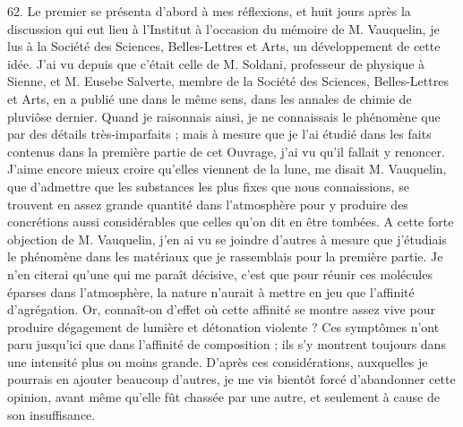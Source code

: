 \documentclass[a4paper, 11pt, oneside, polutonikogreek, french]{article}
\begin{document}
62. Le premier se présenta d'abord à mes réflexions, et huit jours après la discussion qui eut lieu à l'Institut à l'occasion du mémoire de M. Vauquelin, je lus à la Société des Sciences, Belles-Lettres et Arts, un développement de cette idée. J'ai vu depuis que c'était celle de M. Soldani, professeur de physique à Sienne, et M. Eusebe Salverte, membre de la Société des Sciences, Belles-Lettres et Arts, en a publié une dans le même sens, dans les annales de chimie de pluviôse dernier. Quand je raisonnais ainsi, je ne connaissais le phénomène que par des détails très-imparfaits ; mais à mesure que je l'ai étudié dans les faits contenus dans la première partie de cet Ouvrage, j'ai vu qu'il fallait y renoncer. \og J'aime encore mieux croire qu'elles viennent de la lune, me disait M. Vauquelin, que d'admettre que les substances les plus fixes que nous connaissions, se trouvent en assez grande quantité dans l'atmosphère pour y produire des concrétions aussi considérables que celles qu'on dit en être tombées. \fg A cette forte objection de M. Vauquelin, j'en ai vu se joindre d'autres à mesure que j'étudiais le phénomène dans les matériaux que je rassemblais pour la première partie. Je n'en citerai qu'une qui me paraît décisive, c'est que pour réunir ces molécules éparses dans l'atmosphère, la nature n'aurait à mettre en jeu que l'affinité d'agrégation. Or, connaît-on d'effet où cette affinité se montre assez vive pour produire dégagement de lumière et détonation violente ? Ces symptômes n'ont paru jusqu'ici que dans l'affinité de composition ; ils s'y montrent toujours dans une intensité plus ou moins grande. D'après ces considérations, auxquelles je pourrais en ajouter beaucoup d'autres, je me vis bientôt forcé d'abandonner cette opinion, avant même qu'elle fût chassée par une autre, et seulement à cause de son insuffisance.
\end{document}
